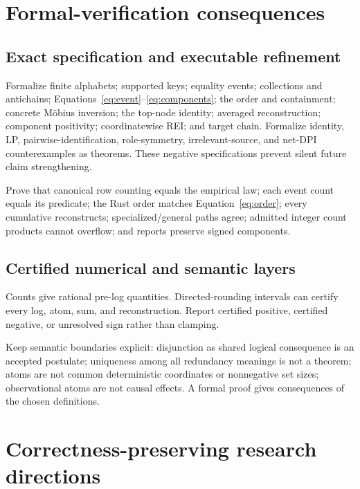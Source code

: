 \documentclass[11pt]{article}
\begin{document}
\section{Formal-verification consequences}

\subsection{Exact specification and executable refinement}

Formalize finite alphabets; supported keys; equality events; collections and
antichains; Equations~\eqref{eq:event}--\eqref{eq:components}; the order and
containment; concrete M\"obius inversion; the top-node identity; averaged
reconstruction; component positivity; coordinatewise REI; and target chain.
Formalize identity, LP, pairwise-identification, role-symmetry, irrelevant-source,
and net-DPI counterexamples as theorems.  These negative specifications prevent
silent future claim strengthening.

Prove that canonical row counting equals the empirical law; each event count
equals its predicate; the Rust order matches Equation~\eqref{eq:order}; every
cumulative reconstructs; specialized/general paths agree; admitted integer
count products cannot overflow; and reports preserve signed components.

\subsection{Certified numerical and semantic layers}

Counts give rational pre-log quantities.  Directed-rounding intervals can
certify every log, atom, sum, and reconstruction.  Report certified positive,
certified negative, or unresolved sign rather than clamping.

Keep semantic boundaries explicit: disjunction as shared logical consequence
is an accepted postulate; uniqueness among all redundancy meanings is not a
theorem; atoms are not common deterministic coordinates or nonnegative set
sizes; observational atoms are not causal effects.  A formal proof gives consequences of the chosen definitions.

\section{Correctness-preserving research directions}
\end{document}
